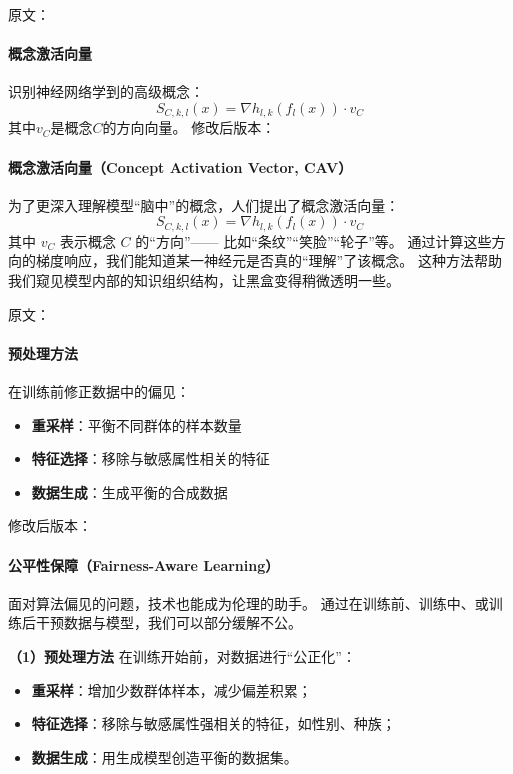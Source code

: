 原文：
\paragraph{概念激活向量}
识别神经网络学到的高级概念：
$$S_{C,k,l}(x) = \nabla h_{l,k}(f_l(x)) \cdot v_C$$
其中$v_C$是概念$C$的方向向量。
修改后版本：
\paragraph{概念激活向量（Concept Activation Vector, CAV）}  
为了更深入理解模型“脑中”的概念，人们提出了概念激活向量：  
$$S_{C,k,l}(x)=\nabla h_{l,k}(f_l(x)) \cdot v_C$$  
其中 $v_C$ 表示概念 $C$ 的“方向”——  
比如“条纹”“笑脸”“轮子”等。  
通过计算这些方向的梯度响应，我们能知道某一神经元是否真的“理解”了该概念。  
这种方法帮助我们窥见模型内部的知识组织结构，让黑盒变得稍微透明一些。



原文：
\paragraph{预处理方法}
在训练前修正数据中的偏见：
\begin{itemize}
\item \textbf{重采样}：平衡不同群体的样本数量
\item \textbf{特征选择}：移除与敏感属性相关的特征
\item \textbf{数据生成}：生成平衡的合成数据
\end{itemize}
修改后版本：
\paragraph{公平性保障（Fairness-Aware Learning）}  
面对算法偏见的问题，技术也能成为伦理的助手。  
通过在训练前、训练中、或训练后干预数据与模型，我们可以部分缓解不公。  

\textbf{（1）预处理方法}  
在训练开始前，对数据进行“公正化”：  
\begin{itemize}
\item \textbf{重采样}：增加少数群体样本，减少偏差积累；  
\item \textbf{特征选择}：移除与敏感属性强相关的特征，如性别、种族；  
\item \textbf{数据生成}：用生成模型创造平衡的数据集。  
\end{itemize}



